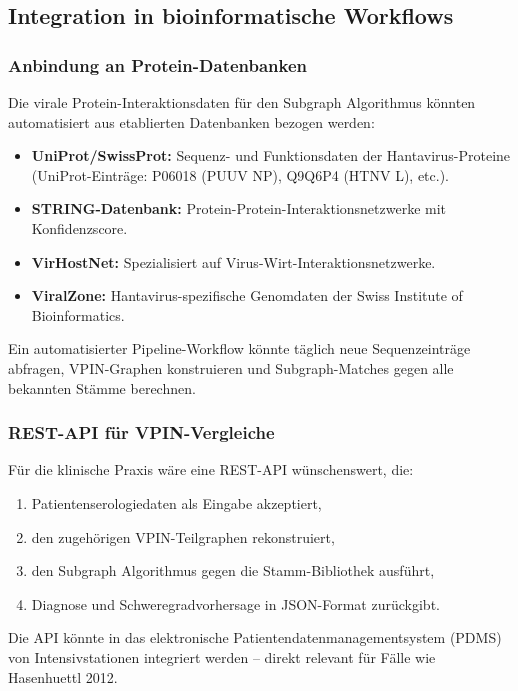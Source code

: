 ﻿\documentclass[a4paper,12pt]{article}
\theoremstyle{definition}
\begin{document}
\subsection{Integration in bioinformatische Workflows}

\subsubsection{Anbindung an Protein-Datenbanken}

Die virale Protein-Interaktionsdaten f\"ur den Subgraph Algorithmus
k\"onnten automatisiert aus etablierten Datenbanken bezogen werden:
\begin{itemize}
    \item \textbf{UniProt/SwissProt:} Sequenz- und Funktionsdaten der
          Hantavirus-Proteine (UniProt-Eintr\"age: P06018 (PUUV NP),
          Q9Q6P4 (HTNV L), etc.).
    \item \textbf{STRING-Datenbank:} Protein-Protein-Interaktionsnetzwerke
          mit Konfidenzscore.
    \item \textbf{VirHostNet:} Spezialisiert auf Virus-Wirt-Interaktionsnetzwerke.
    \item \textbf{ViralZone:} Hantavirus-spezifische Genomdaten der Swiss Institute
          of Bioinformatics.
\end{itemize}
Ein automatisierter Pipeline-Workflow k\"onnte t\"aglich neue Sequenzeintr\"age
abfragen, VPIN-Graphen konstruieren und Subgraph-Matches gegen alle
bekannten St\"amme berechnen.

\subsubsection{REST-API f\"ur VPIN-Vergleiche}

F\"ur die klinische Praxis w\"are eine REST-API w\"unschenswert, die:
\begin{enumerate}
    \item Patientenserologiedaten als Eingabe akzeptiert,
    \item den zugeh\"origen VPIN-Teilgraphen rekonstruiert,
    \item den Subgraph Algorithmus gegen die Stamm-Bibliothek ausf\"uhrt,
    \item Diagnose und Schweregradvorhersage in JSON-Format zur\"uckgibt.
\end{enumerate}
Die API k\"onnte in das elektronische Patientendatenmanagementsystem
(PDMS) von Intensivstationen integriert werden -- direkt relevant f\"ur
F\"alle wie Hasenhuettl 2012.
\end{document}
